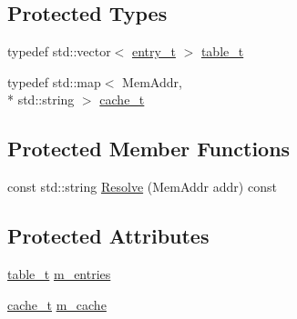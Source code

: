 \subsection*{Protected Types}
\begin{DoxyCompactItemize}
\item 
typedef std\+::vector$<$ \hyperlink{class_simulator_1_1_symbol_table_a91fddb0fa183ac55b5c501629b36478c}{entry\+\_\+t} $>$ \hyperlink{class_simulator_1_1_symbol_table_a105ca53bbb8b93b0773a66b6d07f61f3}{table\+\_\+t}
\item 
typedef std\+::map$<$ Mem\+Addr, \\*
std\+::string $>$ \hyperlink{class_simulator_1_1_symbol_table_a94faed151775b38fe61053121be020cc}{cache\+\_\+t}
\end{DoxyCompactItemize}
\subsection*{Protected Member Functions}
\begin{DoxyCompactItemize}
\item 
const std\+::string \hyperlink{class_simulator_1_1_symbol_table_ae5017deea50d0c1ace01c2eb3e86bdba}{Resolve} (Mem\+Addr addr) const 
\end{DoxyCompactItemize}
\subsection*{Protected Attributes}
\begin{DoxyCompactItemize}
\item 
\hyperlink{class_simulator_1_1_symbol_table_a105ca53bbb8b93b0773a66b6d07f61f3}{table\+\_\+t} \hyperlink{class_simulator_1_1_symbol_table_a81da2f70b6f00568d464924c85c5f6d3}{m\+\_\+entries}
\item 
\hyperlink{class_simulator_1_1_symbol_table_a94faed151775b38fe61053121be020cc}{cache\+\_\+t} \hyperlink{class_simulator_1_1_symbol_table_a6262bb8f93af5d3f148455c160f3c647}{m\+\_\+cache}
\end{DoxyCompactItemize}


